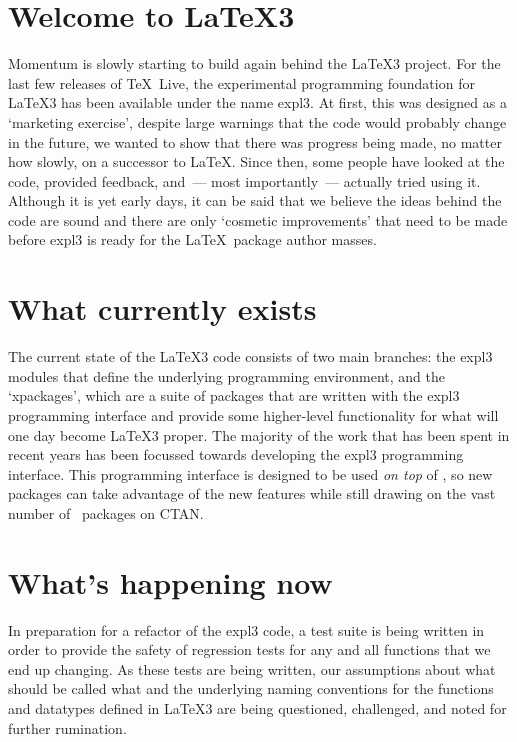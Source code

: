 \documentclass{ltnews}
\begin{document}
 
\maketitle

\section{Welcome to \LaTeX3}

Momentum is slowly starting to build again behind the \LaTeX3 project. For the last few releases of \TeX~Live, the experimental programming foundation for \LaTeX3 has been available under the name \textsf{expl3}. At first, this was designed as a `marketing exercise', despite large warnings that the code would probably change in the future, we wanted to show that there was progress being made, no matter how slowly, on a successor to \LaTeX. Since then, some people have looked at the code, provided feedback, and~--- most importantly~--- actually tried using it. Although it is yet early days, it can be said that we believe the ideas behind the code are sound and there are only `cosmetic improvements' that need to be made before \textsf{expl3} is ready for the \LaTeX~package author masses.

\section{What currently exists}

The current state of the \LaTeX3 code consists of two main branches: the \textsf{expl3} modules that define the underlying programming environment, and the `\textsf{xpackage}s', which are a suite of packages that are written with the \textsf{expl3} programming interface and provide some higher-level functionality for what will one day become \LaTeX3 proper. The majority of the work that has been spent in recent years has been focussed towards developing the \textsf{expl3} programming interface. This programming interface is designed to be used \emph{on top} of \LaTeXe, so new packages can take advantage of the new features while still drawing on the vast number of \LaTeXe\ packages on CTAN.

\section{What's happening now}

In preparation for a refactor of the \textsf{expl3} code, a test suite is being written in order to provide the safety of regression tests for any and all functions that we end up changing. As these tests are being written, our assumptions about what should be called what and the underlying naming conventions for the functions and datatypes defined in \LaTeX3 are being questioned, challenged, and noted for further rumination.
\end{document}
